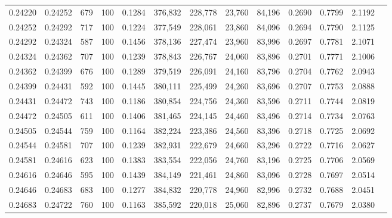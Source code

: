 \begin{tabular}{rrrrrrrrrrrrr}
0.24220 & 0.24252 &   679 & 100 &                                     0.1284 & 376,832 & 228,778 &  23,760 &  84,196 & 0.2690 & 0.7799 & 2.1192 \\
0.24252 & 0.24292 &   717 & 100 &                                     0.1224 & 377,549 & 228,061 &  23,860 &  84,096 & 0.2694 & 0.7790 & 2.1125 \\
0.24292 & 0.24324 &   587 & 100 &                                     0.1456 & 378,136 & 227,474 &  23,960 &  83,996 & 0.2697 & 0.7781 & 2.1071 \\
0.24324 & 0.24362 &   707 & 100 &                                     0.1239 & 378,843 & 226,767 &  24,060 &  83,896 & 0.2701 & 0.7771 & 2.1006 \\
0.24362 & 0.24399 &   676 & 100 &                                     0.1289 & 379,519 & 226,091 &  24,160 &  83,796 & 0.2704 & 0.7762 & 2.0943 \\
0.24399 & 0.24431 &   592 & 100 &                                     0.1445 & 380,111 & 225,499 &  24,260 &  83,696 & 0.2707 & 0.7753 & 2.0888 \\
0.24431 & 0.24472 &   743 & 100 &                                     0.1186 & 380,854 & 224,756 &  24,360 &  83,596 & 0.2711 & 0.7744 & 2.0819 \\
0.24472 & 0.24505 &   611 & 100 &                                     0.1406 & 381,465 & 224,145 &  24,460 &  83,496 & 0.2714 & 0.7734 & 2.0763 \\
0.24505 & 0.24544 &   759 & 100 &                                     0.1164 & 382,224 & 223,386 &  24,560 &  83,396 & 0.2718 & 0.7725 & 2.0692 \\
0.24544 & 0.24581 &   707 & 100 &                                     0.1239 & 382,931 & 222,679 &  24,660 &  83,296 & 0.2722 & 0.7716 & 2.0627 \\
0.24581 & 0.24616 &   623 & 100 &                                     0.1383 & 383,554 & 222,056 &  24,760 &  83,196 & 0.2725 & 0.7706 & 2.0569 \\
0.24616 & 0.24646 &   595 & 100 &                                     0.1439 & 384,149 & 221,461 &  24,860 &  83,096 & 0.2728 & 0.7697 & 2.0514 \\
0.24646 & 0.24683 &   683 & 100 &                                     0.1277 & 384,832 & 220,778 &  24,960 &  82,996 & 0.2732 & 0.7688 & 2.0451 \\
0.24683 & 0.24722 &   760 & 100 &                                     0.1163 & 385,592 & 220,018 &  25,060 &  82,896 & 0.2737 & 0.7679 & 2.0380 \\

\end{tabular}
